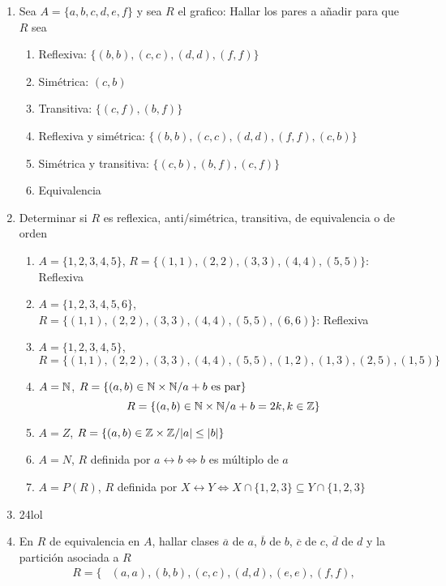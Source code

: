 \documentclass[../practica.root.tex]{subfiles}
\begin{document}
\begin{enumerate}
    \item Sea $A = \{a, b, c, d, e, f\}$ y sea $R$ el grafico:
          Hallar los pares a añadir para que $R$ sea
          \begin{enumerate}
              \item Reflexiva: $\{(b, b), (c, c), (d, d), (f, f)\}$
              \item Simétrica: $(c, b)$
              \item Transitiva: $\{(c, f), (b, f)\}$
              \item Reflexiva y simétrica: $\{(b, b), (c, c), (d, d), (f, f), (c, b)\}$
              \item Simétrica y transitiva: $\{(c, b), (b, f), (c, f)\}$
              \item Equivalencia %
          \end{enumerate}
    \item Determinar si $R$ es reflexica, anti/simétrica, transitiva, de equivalencia o de orden
          \begin{enumerate}
              \item $A = \{1, 2, 3, 4, 5\}$, $R = \{(1, 1), (2, 2), (3, 3), (4, 4), (5, 5)\}$: Reflexiva
              \item $A = \{1, 2, 3, 4, 5, 6\}$, $R = \{(1, 1), (2, 2), (3, 3), (4, 4), (5, 5), (6, 6)\}$: Reflexiva
              \item $A = \{1, 2, 3, 4, 5\}$, $R = \{(1, 1),(2, 2),(3, 3),(4, 4),(5, 5),(1, 2),(1, 3),(2, 5),(1, 5)\}$
              \item $A = \mathbb{N}$, $R = \{(a, b) \in \mathbb{N} \times \mathbb{N} / a + b \text{ es par}\}$
                    \[ R = \{(a, b) \in \mathbb{N} \times \mathbb{N} / a + b = 2k, k \in \mathbb{Z} \} \]
              \item $A = Z$, $R = \{(a, b) \in \mathbb{Z} \times \mathbb{Z} / |a| \leq |b|\}$
              \item $A = N$, $R$ definida por $a \rel b \iff b$ es múltiplo de $a$
              \item $A = P(R)$, $R$ definida por $X \rel Y \iff X \cap \{1, 2, 3\} \subseteq Y \cap \{1, 2, 3\}$
          \end{enumerate}
    \item 24lol
    \item En $R$ de equivalencia en $A$, hallar clases $\overline{a}$ de $a$, $\overline{b}$ de $b$, $\overline{c}$ de $c$, $\overline{d}$ de $d$ y la partición asociada a $R$
          \begin{align*}
              R = \{ & (a, a), (b, b), (c, c), (d, d), (e, e), (f, f),                  \\

\end{align*}
\end{enumerate}
\end{document}
